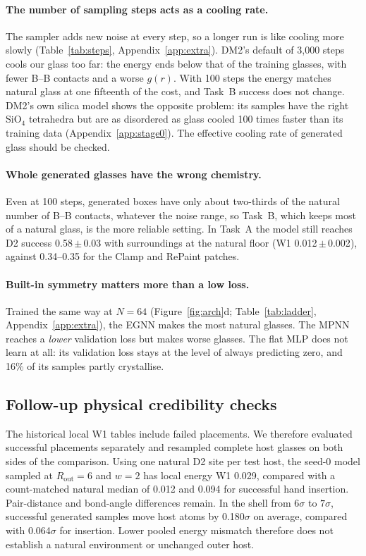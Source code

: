 \documentclass[10pt]{article}
\newcommand{\pmsd}[2]{#1\,{\scriptsize$\pm$\,#2}}
\begin{document}
\paragraph{The number of sampling steps acts as a cooling rate.} The sampler adds new noise at every step, so a longer run is like cooling more slowly (Table~\ref{tab:steps}, Appendix~\ref{app:extra}). DM2's default of 3{,}000 steps cools our glass too far: the energy ends below that of the training glasses, with fewer B--B contacts and a worse $g(r)$. With 100 steps the energy matches natural glass at one fifteenth of the cost, and Task~B success does not change. DM2's own silica model shows the opposite problem: its samples have the right SiO$_4$ tetrahedra but are as disordered as glass cooled 100 times faster than its training data (Appendix~\ref{app:stage0}). The effective cooling rate of generated glass should be checked.

\paragraph{Whole generated glasses have the wrong chemistry.} Even at 100 steps, generated boxes have only about two-thirds of the natural number of B--B contacts, whatever the noise range, so Task~B, which keeps most of a natural glass, is the more reliable setting. In Task~A the model still reaches D2 success \pmsd{0.58}{0.03} with surroundings at the natural floor (W1 \pmsd{0.012}{0.002}), against 0.34--0.35 for the Clamp and RePaint patches.

\paragraph{Built-in symmetry matters more than a low loss.} Trained the same way at $N=64$ (Figure~\ref{fig:arch}d; Table~\ref{tab:ladder}, Appendix~\ref{app:extra}), the EGNN makes the most natural glasses. The MPNN reaches a \emph{lower} validation loss but makes worse glasses. The flat MLP does not learn at all: its validation loss stays at the level of always predicting zero, and 16\% of its samples partly crystallise.

\subsection{Follow-up physical credibility checks}
\label{sec:credibility}

The historical local W1 tables include failed placements. We therefore evaluated successful placements separately and resampled complete host glasses on both sides of the comparison. Using one natural D2 site per test host, the seed-0 model sampled at $R_\mathrm{out}=6$ and $w=2$ has local energy W1 0.029, compared with a count-matched natural median of 0.012 and 0.094 for successful hand insertion. Pair-distance and bond-angle differences remain. In the shell from $6\sigma$ to $7\sigma$, successful generated samples move host atoms by 0.180$\sigma$ on average, compared with 0.064$\sigma$ for insertion. Lower pooled energy mismatch therefore does not establish a natural environment or unchanged outer host.
\end{document}

